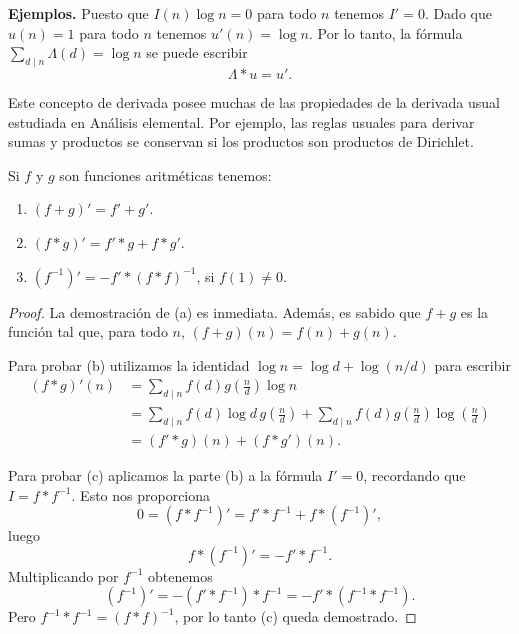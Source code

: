\documentclass[12pt,a4paper]{book}
\begin{document}
    \textbf{Ejemplos.} Puesto que $I(n)\log n=0$ para todo $n$ tenemos $I'=0$. Dado que
    $u(n)=1$ para todo $n$ tenemos $u'(n)=\log n$. Por lo tanto, la fórmula
    $\sum_{d\mid n}\Lambda(d)=\log n$ se puede escribir
    \begin{equation}
        \Lambda*u=u'.
    \end{equation}

    Este concepto de derivada posee muchas de las propiedades de la derivada usual
    estudiada en Análisis elemental. Por ejemplo, las reglas usuales para derivar sumas y
    productos se conservan si los productos son productos de Dirichlet.

    \begin{teorema}
        Si $f$ y $g$ son funciones aritméticas tenemos:
        \begin{enumerate}
            \item[(a)] $(f+g)'=f'+g'$.
            \item[(b)] $(f*g)'=f'*g+f*g'$.
            \item[(c)] $(f^{-1})'=-f'*(f*f)^{-1}$, si $f(1)\neq0$.
        \end{enumerate}
    \end{teorema}

    \begin{proof}
        La demostración de (a) es inmediata. Además, es sabido que $f+g$ es la función tal
        que, para todo $n$, $(f+g)(n)=f(n)+g(n)$.

        Para probar (b) utilizamos la identidad $\log n=\log d+\log(n/d)$ para escribir
        \begin{align*}
            (f*g)'(n)&=\sum_{d\mid n}f(d)g\left(\frac{n}{d}\right)\log n\\
            &=\sum_{d\mid n}f(d)\log d\,g\left(\frac{n}{d}\right)
            +\sum_{d\mid n}f(d)g\left(\frac{n}{d}\right)\log\left(\frac{n}{d}\right)\\
            &=(f'*g)(n)+(f*g')(n).
        \end{align*}

        Para probar (c) aplicamos la parte (b) a la fórmula $I'=0$, recordando que
        $I=f*f^{-1}$. Esto nos proporciona
        \begin{equation*}
            0=(f*f^{-1})'=f'*f^{-1}+f*(f^{-1})',
        \end{equation*}
        luego
        \begin{equation*}
            f*(f^{-1})'=-f'*f^{-1}.
        \end{equation*}
        Multiplicando por $f^{-1}$ obtenemos
        \begin{equation*}
            (f^{-1})'=-(f'*f^{-1})*f^{-1}=-f'*(f^{-1}*f^{-1}).
        \end{equation*}
        Pero $f^{-1}*f^{-1}=(f*f)^{-1}$, por lo tanto (c) queda demostrado.
    \end{proof}
\end{document}

